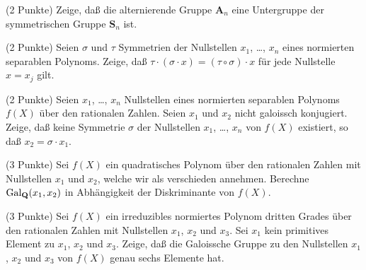 \documentclass{algsheet}
\author{Dipl.-Math.~Franz Vogler}
\date{11.~Januar 2011}
\begin{document}
                \maketitle





\begin{exercise}(2 Punkte)\newline
    Zeige, daß die alternierende Gruppe \(\mathbf A_n\) eine Untergruppe der
    symmetrischen Gruppe \(\mathbf S_n\) ist.
\end{exercise}



\begin{exercise}(2 Punkte)\newline
    Seien \(\sigma\) und \(\tau\) Symmetrien der Nullstellen \(x_1\), \dots, \(x_n\) eines normierten
    separablen Polynoms. Zeige, daß \(\tau \cdot (\sigma \cdot x) = (\tau \circ \sigma) \cdot x\) für jede Nullstelle
    $x=x_j$ gilt. 
\end{exercise}



\begin{exercise}(2 Punkte)\newline
    Seien \(x_1\), \dots, \(x_n\) Nullstellen eines normierten separablen Polynoms \(f(X)\) über den rationalen
    Zahlen. Seien \(x_1\) und \(x_2\) nicht galoissch konjugiert. Zeige, daß keine Symmetrie
    \(\sigma\) der Nullstellen \(x_1\), \dots, \(x_n\) von \(f(X)\) existiert, so daß
    \(x_2 = \sigma \cdot x_1\).
\end{exercise}




\begin{exercise}(3 Punkte)\newline
    Sei \(f(X)\) ein quadratisches Polynom über den rationalen Zahlen mit Nullstellen \(x_1\) und \(x_2\),
    welche wir als verschieden annehmen. Berechne \(\mathrm{Gal}_{\mathbf Q}(x_1, x_2)\) in Abhängigkeit der
    Diskriminante von \(f(X)\).
\end{exercise}



\begin{exercise}(3 Punkte)\newline
    Sei \(f(X)\) ein irreduzibles normiertes Polynom dritten Grades über den rationalen Zahlen mit
    Nullstellen \(x_1\), \(x_2\) und \(x_3\). Sei \(x_1\) kein primitives Element zu \(x_1\), \(x_2\)
    und \(x_3\). Zeige, daß die Galoissche Gruppe zu den Nullstellen \(x_1\), \(x_2\) und \(x_3\) von
    \(f(X)\) genau sechs Elemente hat.
\end{exercise}
\end{document}
